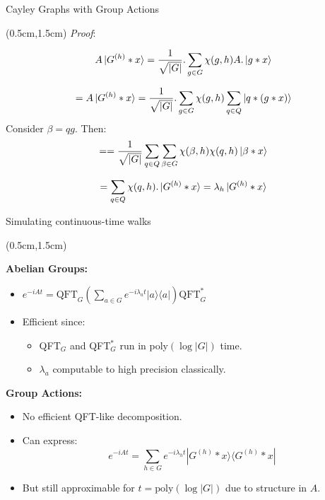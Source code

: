 \documentclass{beamer}
\theoremstyle{definition}
\begin{document}
\begin{frame}{Cayley Graphs with Group Actions}
    
    \begin{textblock*}{12cm}(0.5cm,1.5cm)
        \textit{Proof}:

        \[
        A\ket{G^{(h)}*x} = \frac{1}{\sqrt{|G|}}.\sum_{g \in G}\chi(g,h) A.\ket{g*x}
        \]

        \[
        = A\ket{G^{(h)}*x} = \frac{1}{\sqrt{|G|}}.\sum_{g \in G}\chi(g,h)\sum_{q \in Q}\ket{q*(g*x)}
        \]
        Consider $\beta = qg$. Then:
        \[
        = = \frac{1}{\sqrt{|G|}}\sum_{q \in Q}\sum_{\beta \in G}\chi(\beta,h)\chi(q,h)\ket{\beta * x}
        \]

        \[
        = \sum_{q \in Q}\chi(q,h).\ket{G^{(h)}*x} = \lambda_h \ket{G^{(h)}*x}
        \]

    \end{textblock*}

\end{frame}







\begin{frame}{Simulating continuous-time walks}
    
    \begin{textblock*}{12cm}(0.5cm,1.5cm)
            
    \textbf{Abelian Groups:}
    \begin{itemize}
        \item $e^{-iAt} = \text{QFT}_G \left( \sum_{a \in G} e^{-i\lambda_a t} |a\rangle\langle a| \right) \text{QFT}_G^*$
        \item Efficient since:
        \begin{itemize}
            \item QFT$_G$ and QFT$_G^*$ run in poly$(\log|G|)$ time.
            \item $\lambda_a$ computable to high precision classically.
        \end{itemize}
    \end{itemize}

    \vspace{0.5cm}
    \textbf{Group Actions:}
    \begin{itemize}
        \item No efficient QFT-like decomposition.
        \item Can express:
        \[
        e^{-iAt} = \sum_{h \in G} e^{-i\lambda_h t} |G^{(h)} * x\rangle\langle G^{(h)} * x|
        \]
        \item But still approximable for $t = \text{poly}(\log|G|)$ due to structure in $A$.
    \end{itemize}

        


    \end{textblock*}

\end{frame}
\end{document}
